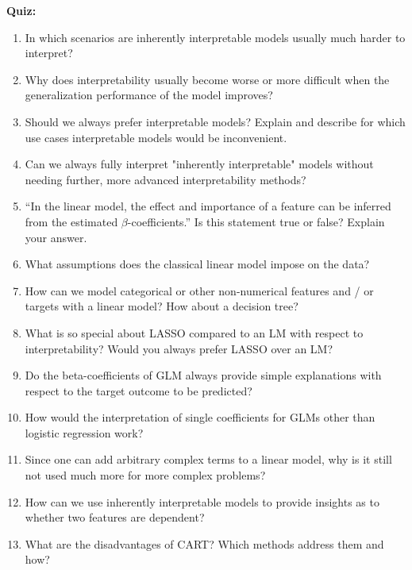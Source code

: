 \textbf{Quiz:}
\begin{enumerate}
   	\item In which scenarios are inherently interpretable models usually much harder to interpret?
   	\item Why does interpretability usually become worse or more difficult when the generalization performance of the model improves?
   	\item Should we always prefer interpretable models? Explain and describe for which use cases interpretable models would be inconvenient.
    \item Can we always fully interpret "inherently interpretable" models without needing further, more advanced interpretability methods?
    
  	\item ``In the linear model, the effect and importance of a feature can be inferred from the estimated $\beta$-coefficients.'' Is this statement true or false? Explain your answer.
    \item What assumptions does the classical linear model impose on the data?
    \item How can we model categorical or other non-numerical features and / or targets with a linear model? How about a decision tree?
   	\item What is so special about LASSO compared to an LM with respect to interpretability? Would you always prefer LASSO over an LM?
    
   	\item Do the beta-coefficients of GLM always provide simple explanations with respect to the target outcome to be predicted? 
    \item How would the interpretation of single coefficients for GLMs other than logistic regression work?
    
  	\item Since one can add arbitrary complex terms to a linear model, why is it still not used much more for more complex problems?
   	\item How can we use inherently interpretable models to provide insights as to whether two features are dependent?
    
   	\item What are the disadvantages of CART? Which methods address them and how?
\end{enumerate}


    
    